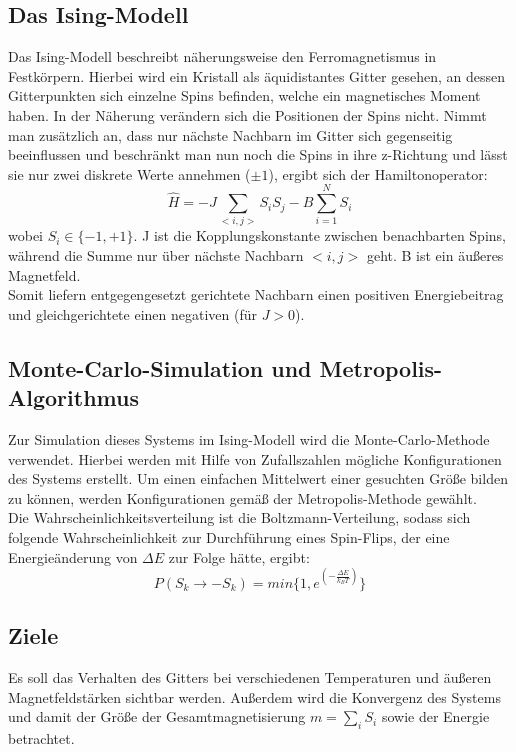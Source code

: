 \subsection{Das Ising-Modell}
Das Ising-Modell beschreibt näherungsweise den Ferromagnetismus in Festkörpern. Hierbei wird ein Kristall als äquidistantes Gitter gesehen, an dessen Gitterpunkten sich einzelne Spins befinden, welche ein magnetisches Moment haben. In der Näherung verändern sich die Positionen der Spins nicht. Nimmt man zusätzlich an, dass nur nächste Nachbarn im Gitter sich gegenseitig beeinflussen und beschränkt man nun noch die Spins in ihre z-Richtung und lässt sie nur zwei diskrete Werte annehmen ($\pm1$), ergibt sich der Hamiltonoperator:\\
\[
\hat{H}=-J\sum_{<i,j>} S_i S_j - B\sum_{i=1}^N S_i
\]
wobei $S_i \in \{-1,+1\}$. J ist die Kopplungskonstante zwischen benachbarten Spins, während die Summe nur über nächste Nachbarn $<i,j>$ geht. B ist ein äußeres Magnetfeld.\\
Somit liefern entgegengesetzt gerichtete Nachbarn einen positiven Energiebeitrag und gleichgerichtete einen negativen (für $J>0$).\\

\subsection{Monte-Carlo-Simulation und Metropolis-Algorithmus}
Zur Simulation dieses Systems im Ising-Modell wird die Monte-Carlo-Methode verwendet. Hierbei werden mit Hilfe von Zufallszahlen mögliche Konfigurationen des Systems erstellt. Um einen einfachen Mittelwert einer gesuchten Größe bilden zu können, werden Konfigurationen gemäß der Metropolis-Methode gewählt.\\
Die Wahrscheinlichkeitsverteilung ist die Boltzmann-Verteilung, sodass sich folgende Wahrscheinlichkeit zur Durchführung eines Spin-Flips, der eine Energieänderung von $\Delta E$ zur Folge hätte, ergibt:
\[
P(S_k \rightarrow -S_k)=min\{ 1, e^{(-\frac{\Delta E}{k_B T})} \}
\]


\subsection{Ziele}
Es soll das Verhalten des Gitters bei verschiedenen Temperaturen und äußeren Magnetfeldstärken sichtbar werden. Außerdem wird die Konvergenz des Systems und damit der Größe der Gesamtmagnetisierung $m=\sum_i S_i$ sowie der Energie betrachtet.